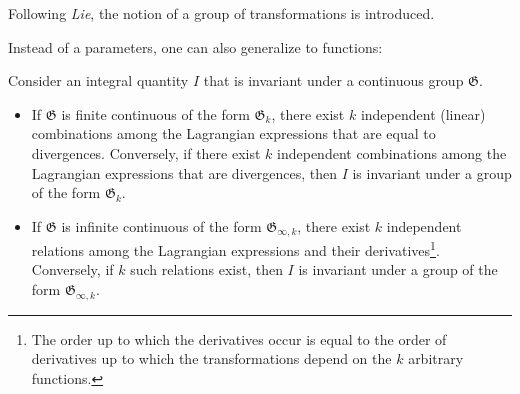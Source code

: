     Following \textit{Lie}, the notion of a group of transformations is introduced.

    Instead of a parameters, one can also generalize to functions:

    \begin{theorem}[Noether]\label{var:noether}
        Consider an integral quantity $I$ that is invariant under a continuous group $\mathfrak{G}$.
        \begin{itemize}
            \item If $\mathfrak{G}$ is finite continuous of the form $\mathfrak{G}_k$, there exist $k$ independent (linear) combinations among the Lagrangian expressions that are equal to divergences. Conversely, if there exist $k$ independent combinations among the Lagrangian expressions that are divergences, then $I$ is invariant under a group of the form $\mathfrak{G}_k$.
            \item If $\mathfrak{G}$ is infinite continuous of the form $\mathfrak{G}_{\infty,k}$, there exist $k$ independent relations among the Lagrangian expressions and their derivatives\footnote{The order up to which the derivatives occur is equal to the order of derivatives up to which the transformations depend on the $k$ arbitrary functions.}. Conversely, if $k$ such relations exist, then $I$ is invariant under a group of the form $\mathfrak{G}_{\infty,k}$.
        \end{itemize}
    \end{theorem}

